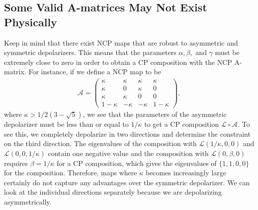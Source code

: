 \documentclass[12pt]{iopart}
\begin{document}
\subsection{Some Valid A-matrices May Not Exist Physically}
\label{App:3}

Keep in mind that there exist NCP maps that are robust to asymmetric and symmetric depolarizers. This means that the parameters $\alpha, \beta,$ and $\gamma$ must be extremely close to zero in order to obtain a CP composition with the NCP A-matrix. For instance, if we define a NCP map to be
\begin{align}
\label{Eq:A_Robust}
    \mathcal{A} = 
    \left(
    \begin{array}{cccc}
        \kappa & \kappa & \kappa & \kappa \\
        \kappa & 0 & \kappa & 0 \\
        \kappa & \kappa & 0 & 0 \\
        1-\kappa & -\kappa & -\kappa & 1-\kappa 
    \end{array}
    \right),
\end{align}
where $\kappa>1/2(3-\sqrt{5})$, we see that the parameters of the asymmetric depolarizer must be less than or equal to $1/\kappa$ to get a CP composition $\mathcal{L} \circ \mathcal{A}$. To see this, we completely depolarize in two directions and determine the constraint on the third direction. The eigenvalues of the composition with $\mathcal{L}(1/\kappa, 0, 0)$ and $\mathcal{L}(0, 0, 1/\kappa)$ contain one negative value and the composition with $\mathcal{L}(0,\beta,0)$ requires $\beta=1/\kappa$ for a CP composition, which gives the eigenvalues of $\{ 1, 1, 0, 0 \}$ for the composition. Therefore, maps where $\kappa$ becomes increasingly large certainly do not capture any advantages over the symmetric depolarizer. We can look at the individual directions separately because we are depolarizing asymmetrically.
\end{document}
